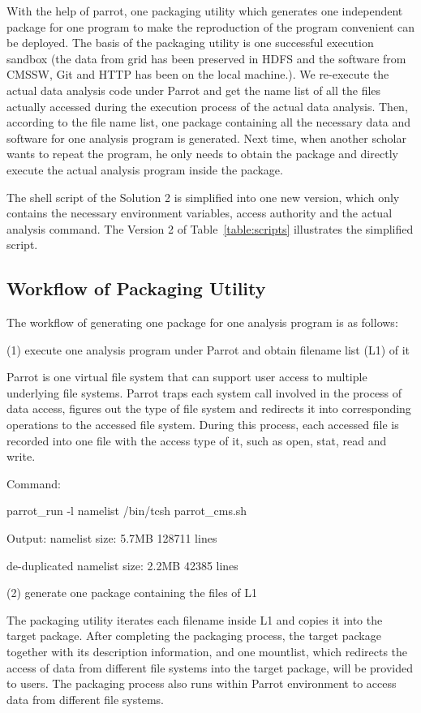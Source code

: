 \documentclass{acm_proc_article-sp}
\begin{document}
With the help of parrot, one packaging utility which generates one independent package for one program to make the reproduction of the program convenient can be deployed. The basis of the packaging utility is one successful execution sandbox (the data from grid has been preserved in HDFS and the software from CMSSW, Git and HTTP has been on the local machine.). We re-execute the actual data analysis code under Parrot and get the name list of all the files actually accessed during the execution process of the actual data analysis. Then, according to the file name list, one package containing all the necessary data and software for one analysis program is generated. Next time, when another scholar wants to repeat the program, he only needs to obtain the package and directly execute the actual analysis program inside the package.

The shell script of the Solution 2 is simplified into one new version, which only contains the necessary environment variables, access authority and the actual analysis command. The Version 2 of Table~\ref{table:scripts} illustrates the simplified script.

\subsection{Workflow of Packaging Utility}
The workflow of generating one package for one analysis program is as follows:

(1) execute one analysis program under Parrot and obtain filename list (L1) of it

Parrot is one virtual file system that can support user access to multiple underlying file systems. Parrot traps each system call involved in the process of data access, figures out the type of file system and redirects it into corresponding operations to the accessed file system. During this process, each accessed file is recorded into one file with the access type of it, such as open, stat, read and write.

Command:

parrot\_run -l namelist /bin/tcsh parrot\_cms.sh

Output:
namelist size: 5.7MB     128711 lines

de-duplicated namelist size: 2.2MB   42385 lines

(2) generate one package containing the files of L1 

The packaging utility iterates each filename inside L1 and copies it into the target package. After completing the packaging process, the target package together with its description information, and one mountlist, which redirects the access of data from different file systems into the target package, will be provided to users. The packaging process also runs within Parrot environment to access data from different file systems.
\end{document}
